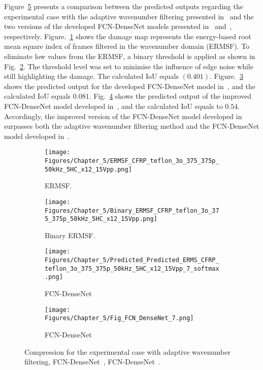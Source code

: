 Figure~\ref{fig:exp_erms_case_comp} presents a comparison between the predicted outputs regarding the experimental case with the adaptive wavenumber filtering presented in~\cite{Ijjeh2021} and the two versions of the developed FCN-DenseNet models presented in~\cite{Ijjeh2021} and~\cite{Ijjeh2022}, respectively.
Figure.~\ref{fig:ERMSF} shows the damage map represents the energy-based root mean square index of frames filtered in the wavenumber domain (ERMSF).
To eliminate low values from the ERMSF, a binary threshold is applied as shown in Fig.~\ref{fig:Binary_ERMSF}.
The threshold level was set to minimise the influence of edge noise while still highlighting the damage.
The calculated IoU equals $(0.401)$.
Figure.~\ref{fig:FCN_densenet_2021} shows the predicted output for the developed FCN-DenseNet model in~\cite{Ijjeh2021}, and the calculated IoU equals $0.081$. 
Fig.~\ref{fig:FCN_densenet_2022} shows the predicted output of the improved FCN-DenseNet model developed in~\cite{Ijjeh2022}, and the calculated IoU equals to $0.54$.
Accordingly, the improved version of the FCN-DenseNet model developed in~\cite{Ijjeh2022} surpasses both the adaptive wavenumber filtering method and the FCN-DenseNet model developed in~\cite{Ijjeh2021}.
\begin{figure} [!h]
	\centering
	\begin{subfigure}[b]{.48\textwidth}
		\centering
		\texttt{[image: Figures/Chapter\_5/ERMSF\_CFRP\_teflon\_3o\_375\_375p\_50kHz\_5HC\_x12\_15Vpp.png]}
		\caption{ERMSF.}
		\label{fig:ERMSF}
	\end{subfigure}
	\hfill
	\begin{subfigure}[b]{.48\textwidth}
		\centering
		\texttt{[image: Figures/Chapter\_5/Binary\_ERMSF\_CFRP\_teflon\_3o\_375\_375p\_50kHz\_5HC\_x12\_15Vpp.png]}
		\caption{Binary ERMSF.}
		\label{fig:Binary_ERMSF}	
	\end{subfigure}
	\hfill
	\begin{subfigure}[b]{.48\textwidth}
		\centering
		\texttt{[image: Figures/Chapter\_5/Predicted\_Predicted\_ERMS\_CFRP\_teflon\_3o\_375\_375p\_50kHz\_5HC\_x12\_15Vpp\_7\_softmax.png]}
		\caption{FCN-DenseNet~\cite{Ijjeh2021}}
		\label{fig:FCN_densenet_2021}
	\end{subfigure}
	\hfill
	\begin{subfigure}[b]{.48\textwidth}
		\centering
		\texttt{[image: Figures/Chapter\_5/Fig\_FCN\_DenseNet\_7.png]}
		\caption{FCN-DenseNet~\cite{Ijjeh2022}}
		\label{fig:FCN_densenet_2022}	
	\end{subfigure}
	\caption{Compression for the experimental case with adaptive wavenumber filtering, FCN-DenseNet~\cite{Ijjeh2021}, FCN-DenseNet~\cite{Ijjeh2022}.}
	\label{fig:exp_erms_case_comp}
\end{figure}

